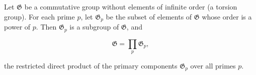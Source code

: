 Let $\mathfrak{G}$ be a commutative group without elements of infinite order (a torsion group). For each prime $p$, let $\mathfrak{G}_p$ be the subset of elements of $\mathfrak{G}$ whose order is a power of $p$. Then $\mathfrak{G}_p$ is a subgroup of $\mathfrak{G}$, and

$$\mathfrak{G} = \prod_p \mathfrak{G}_p,$$

the restricted direct product of the primary components $\mathfrak{G}_p$ over all primes $p$.
